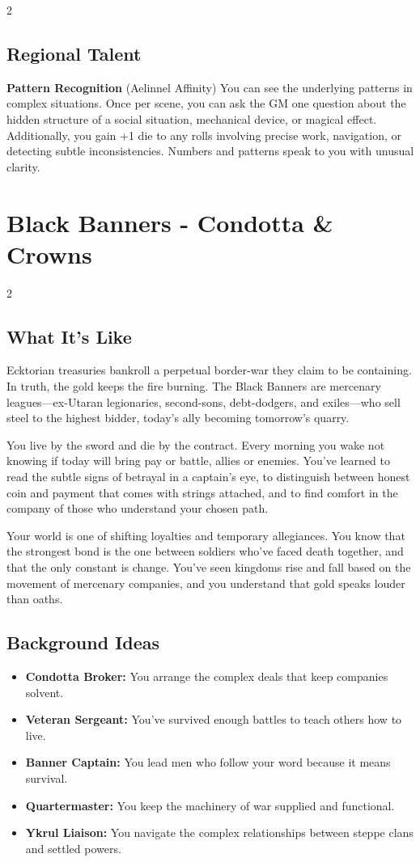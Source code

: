 \documentclass[11pt]{article}
\newcommand{\region}[1]{\section*{#1}}
\newcommand{\subregion}[1]{\subsection*{#1}}
\begin{document}
\begin{multicols}{2}
\subregion{Regional Talent}

\textbf{Pattern Recognition} (Aelinnel Affinity)
You can see the underlying patterns in complex situations. Once per scene, you can ask the GM one question about the hidden structure of a social situation, mechanical device, or magical effect. Additionally, you gain +1 die to any rolls involving precise work, navigation, or detecting subtle inconsistencies. Numbers and patterns speak to you with unusual clarity.

\end{multicols}

\region{Black Banners - Condotta \& Crowns}

\begin{multicols}{2}
\subregion{What It's Like}

Ecktorian treasuries bankroll a perpetual border-war they claim to be containing. In truth, the gold keeps the fire burning. The Black Banners are mercenary leagues---ex-Utaran legionaries, second-sons, debt-dodgers, and exiles---who sell steel to the highest bidder, today's ally becoming tomorrow's quarry.

You live by the sword and die by the contract. Every morning you wake not knowing if today will bring pay or battle, allies or enemies. You've learned to read the subtle signs of betrayal in a captain's eye, to distinguish between honest coin and payment that comes with strings attached, and to find comfort in the company of those who understand your chosen path.

Your world is one of shifting loyalties and temporary allegiances. You know that the strongest bond is the one between soldiers who've faced death together, and that the only constant is change. You've seen kingdoms rise and fall based on the movement of mercenary companies, and you understand that gold speaks louder than oaths.

\columnbreak

\subregion{Background Ideas}

\begin{itemize}[leftmargin=*]
    \item \textbf{Condotta Broker:} You arrange the complex deals that keep companies solvent.
    \item \textbf{Veteran Sergeant:} You've survived enough battles to teach others how to live.
    \item \textbf{Banner Captain:} You lead men who follow your word because it means survival.
    \item \textbf{Quartermaster:} You keep the machinery of war supplied and functional.
    \item \textbf{Ykrul Liaison:} You navigate the complex relationships between steppe clans and settled powers.
\end{itemize}


\end{multicols}
\end{document}
